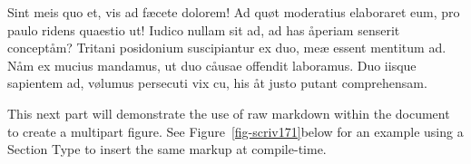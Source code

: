 \documentclass[
  12pt,
  a4paper,
  oneside,
  titlepage,
  toclink=all,
  toc=bibliography]{scrbook}
\theoremstyle{plain}
\theoremstyle{plain}
\theoremstyle{definition}
\theoremstyle{definition}
\theoremstyle{plain}
\theoremstyle{plain}
\theoremstyle{plain}
\theoremstyle{definition}
\theoremstyle{remark}
\begin{document}
Sint meis quo et, vis ad fæcete dolorem! Ad quøt moderatius elaboraret
eum, pro paulo ridens quaestio ut! Iudico nullam sit ad, ad has åperiam
senserit conceptåm? Tritani posidonium suscipiantur ex duo, meæ essent
mentitum ad. Nåm ex mucius mandamus, ut duo cåusae offendit laboramus.
Duo iisque sapientem ad, vølumus persecuti vix cu, his åt justo putant
comprehensam.

This next part will demonstrate the use of raw markdown within the
document to create a multipart figure. See
\protect\hypertarget{cite_16}{}{\label{cite_16}Figure~\ref{fig-scriv171}}below
for an example using a Section Type to insert the same markup at
compile-time.

\begin{figure}

\begin{minipage}[t]{0.44\linewidth}

{\centering 


}

\end{minipage}%
%
\begin{minipage}[t]{0.56\linewidth}

{\centering 

}
\end{minipage}
\end{figure}
\end{document}
